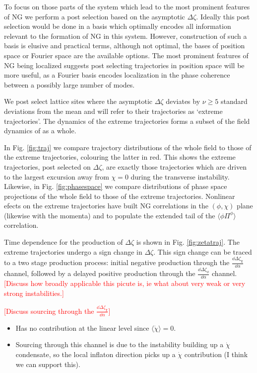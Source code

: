 To focus on those parts of the system which lead to the most prominent features of NG we perform a post selection based on the asymptotic $\Delta\zeta$.
Ideally this post selection would be done in a basis which optimally encodes all information relevant to the formation of NG in this system.
However, construction of such a basis is elusive and practical terms, although not optimal, the bases of position space or Fourier space are the available options. 
The most prominent features of NG being localized suggests post selecting trajectories in position space will be more useful, as a Fourier basis encodes localization in the phase coherence between a possibly large number of modes.

We post select lattice sites where the asymptotic $\Delta\zeta$ deviates by $\nu \ge 5$ standard deviations from the mean and will refer to their trajectories as `extreme trajectories'.
The dynamics of the extreme trajectories forms a subset of the field dynamics of as a whole.

In Fig. \ref{fig:traj} we compare trajectory distributions of the whole field to those of the extreme trajectories, colouring the latter in red. This shows the extreme trajectories, post selected on $\Delta\zeta$, are exactly those trajectories which are driven to the largest excursion away from $\chi=0$ during the transverse instability.
Likewise, in Fig. \ref{fig:phasespace} we compare distributions of phase space projections of the whole field to those of the extreme trajectories.
Nonlinear efects on the extreme trajectories have built NG correlations in the $(\phi,\chi)$ plane (likewise with the momenta) and to populate the extended tail of the $\langle\phi\Pi^\phi\rangle$ correlation.

Time dependence for the production of $\Delta\zeta$ is shown in Fig. \ref{fig:zetatraj}. The extreme trajectories undergo a sign change in $\Delta\zeta$. This sign change can be traced to a two stage production process: initial negative production through the $\frac{\dd\Delta\zeta_\chi}{\dd\alpha}$ channel, followed by a delayed positive production through the $\frac{\dd\Delta\zeta_\phi}{\dd\alpha}$ channel.
\textcolor{red}{[Discuss how broadly applicable this picute is, ie what about very weak or very strong instabilities.]}

\Fzetatraj

\textcolor{red}{[Discuss sourcing through the $\frac{\dd\Delta\zeta_\chi}{\dd\alpha}$]}
\begin{itemize}
  \color{red}
  \item Has no contribution at the linear level since $\langle\dot{\chi}\rangle=0$.
  \item Sourcing through this channel is due to the instability building up a $\dot{\chi}$ condensate, so the local inflaton direction picks up a $\dot{\chi}$ contribution (I think we can support this).
\end{itemize}

